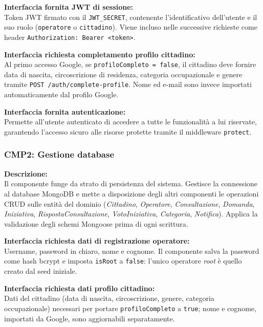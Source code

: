 \documentclass[12pt, a4paper]{article}
\newcommand{\interfacciarichiesta}[1]{\textbf{Interfaccia richiesta #1:}}
\newcommand{\interfacciafornita}[1]{\textbf{Interfaccia fornita #1:}}
\begin{document}
\interfacciafornita{JWT di sessione}\\
Token JWT firmato con il \texttt{JWT\_SECRET}, contenente l'identificativo dell'utente e il suo
ruolo (\texttt{operatore} o \texttt{cittadino}). Viene incluso nelle successive richieste come
header \texttt{Authorization: Bearer <token>}.

\interfacciarichiesta{completamento profilo cittadino}\\
Al primo accesso Google, se \texttt{profiloCompleto = false}, il cittadino deve fornire data di
nascita, circoscrizione di residenza, categoria occupazionale e genere tramite
\texttt{POST /auth/complete-profile}. Nome ed e-mail sono invece importati automaticamente dal
profilo Google.

\interfacciafornita{autenticazione}\\
Permette all'utente autenticato di accedere a tutte le funzionalità a lui riservate, garantendo
l'accesso sicuro alle risorse protette tramite il middleware \texttt{protect}.

\subsubsection*{CMP2: Gestione database}

\textbf{Descrizione:}\\
Il componente funge da strato di persistenza del sistema. Gestisce la connessione al database
MongoDB e mette a disposizione degli altri componenti le operazioni CRUD sulle entità del dominio
(\textit{Cittadino}, \textit{Operatore}, \textit{Consultazione}, \textit{Domanda},
\textit{Iniziativa}, \textit{RispostaConsultazione}, \textit{VotoIniziativa}, \textit{Categoria},
\textit{Notifica}).
Applica la validazione degli schemi Mongoose prima di ogni scrittura.

\interfacciarichiesta{dati di registrazione operatore}\\
Username, password in chiaro, nome e cognome. Il componente salva la password come hash bcrypt e
imposta \texttt{isRoot} a \texttt{false}: l'unico operatore \textit{root} è quello creato dal seed
iniziale.

\interfacciarichiesta{dati profilo cittadino}\\
Dati del cittadino (data di nascita, circoscrizione, genere, categoria occupazionale) necessari per
portare \texttt{profiloCompleto} a \texttt{true}; nome e cognome, importati da Google, sono
aggiornabili separatamente.
\end{document}
